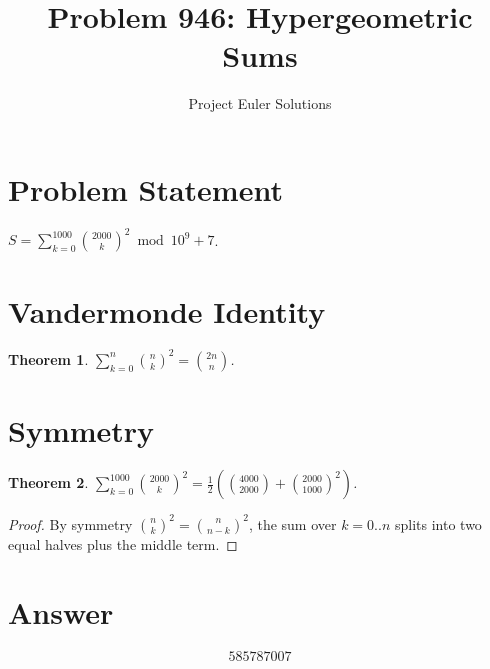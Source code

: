 \documentclass[11pt]{article}
\title{Problem 946: Hypergeometric Sums}
\author{Project Euler Solutions}
\date{}
\newtheorem{theorem}{Theorem}
\theoremstyle{definition}
\begin{document}
\maketitle

\section{Problem Statement}
$S = \sum_{k=0}^{1000} \binom{2000}{k}^2 \bmod 10^9+7$.

\section{Vandermonde Identity}
\begin{theorem}
$\sum_{k=0}^n \binom{n}{k}^2 = \binom{2n}{n}$.
\end{theorem}

\section{Symmetry}
\begin{theorem}
$\sum_{k=0}^{1000} \binom{2000}{k}^2 = \frac{1}{2}\left(\binom{4000}{2000} + \binom{2000}{1000}^2\right)$.
\end{theorem}

\begin{proof}
By symmetry $\binom{n}{k}^2 = \binom{n}{n-k}^2$, the sum over $k=0..n$ splits into two equal halves plus the middle term.
\end{proof}

\section{Answer}

\[
\boxed{585787007}
\]
\end{document}
